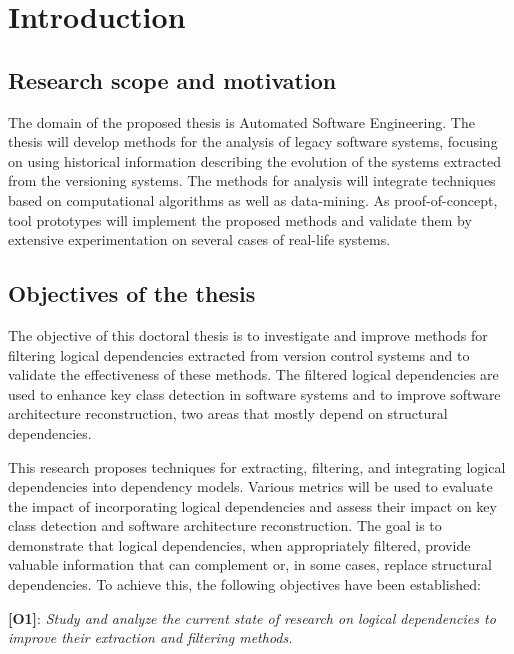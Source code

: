 \chapter{Introduction}
\section{Research scope and motivation}


The domain of the proposed thesis is Automated Software Engineering. The thesis will develop methods for the analysis of legacy software systems, focusing on using historical information describing the evolution of the systems extracted from the versioning systems. 
The methods for analysis will integrate techniques based on computational algorithms as well as data-mining. As proof-of-concept, tool prototypes will implement the proposed methods and validate them by extensive experimentation on several cases of real-life systems.\\

\section{Objectives of the thesis}

\hspace{4em}The objective of this doctoral thesis is to investigate and improve methods for filtering logical dependencies extracted from version control systems and to validate the effectiveness of these methods. The filtered logical dependencies are used to enhance key class detection in software systems and to improve software architecture reconstruction, two areas that mostly depend on structural dependencies.

This research proposes techniques for extracting, filtering, and integrating logical dependencies into dependency models. Various metrics will be used to evaluate the impact of incorporating logical dependencies and assess their impact on key class detection and software architecture reconstruction. The goal is to demonstrate that logical dependencies, when appropriately filtered, provide valuable information that can complement or, in some cases, replace structural dependencies.
To achieve this, the following objectives have been established:

\textbf{[O1]}: \textit{Study and analyze the current state of research on logical dependencies to improve their extraction and filtering methods.}

